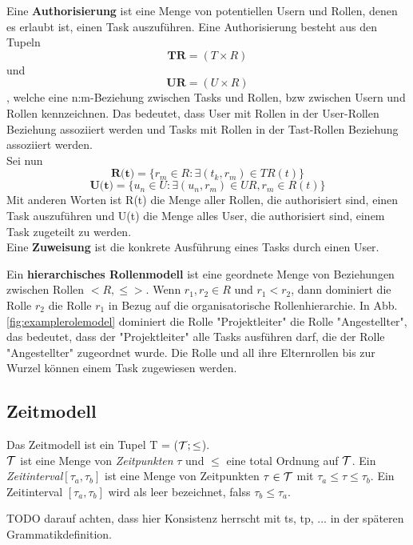 Eine \textbf{Authorisierung} ist eine Menge von potentiellen Usern und Rollen, denen es erlaubt ist, einen Task auszuführen. Eine Authorisierung besteht aus den Tupeln $$\textbf{TR} = (T\times R)$$ und $$\textbf{UR} = (U\times R)$$, welche eine n:m-Beziehung zwischen Tasks und Rollen, bzw zwischen Usern und Rollen kennzeichnen. Das bedeutet, dass User mit Rollen in der User-Rollen Beziehung assoziiert werden und Tasks mit Rollen in der Tast-Rollen Beziehung assoziiert werden.\\
Sei nun $$\textbf{R(t)} = \{r_m \in R: \exists(t_k, r_m) \in TR(t)\}$$
$$\textbf{U(t)} = \{u_n \in U: \exists(u_n, r_m) \in UR, r_m \in R(t)\}$$
Mit anderen Worten ist R(t) die Menge aller Rollen, die authorisiert sind, einen Task auszuführen und U(t) die Menge alles User, die authorisiert sind, einem Task zugeteilt zu werden.\\
Eine \textbf{Zuweisung} ist die konkrete Ausführung eines Tasks durch einen User.

Ein \textbf{hierarchisches Rollenmodell} ist eine geordnete Menge von Beziehungen zwischen Rollen $<R, \leq>$. Wenn $r_1, r_2 \in R$ und $r_1 < r_2$, dann dominiert die Rolle $r_2$ die Rolle $r_1$ in Bezug auf die organisatorische Rollenhierarchie. In Abb. \ref{fig:examplerolemodel} dominiert die Rolle "Projektleiter" die Rolle "Angestellter", das bedeutet, dass der "Projektleiter" alle Tasks ausführen darf, die der Rolle "Angestellter" zugeordnet wurde.
Die Rolle und all ihre Elternrollen bis zur Wurzel können einem Task zugewiesen werden.

\cite{wolter_modeling_of_TBAC_in_BPMN}

\subsection{Zeitmodell}
Das Zeitmodell ist ein Tupel T = ($\mathcal{T};\leq$).\\
$\mathcal{T}$ ist eine Menge von \textit{Zeitpunkten} $\tau$ und $\leq$ eine total Ordnung auf $\mathcal{T}$.
Ein \textit{Zeitinterval}$[\tau_a, \tau_b]$ ist eine Menge von Zeitpunkten $\tau \in \mathcal{T}$ mit $\tau_a \leq \tau \leq \tau_b$.
Ein Zeitinterval $[\tau_a, \tau_b]$ wird als leer bezeichnet, falss $\tau_b \leq \tau_a$.


TODO darauf achten, dass hier Konsistenz herrscht mit ts, tp, ... in der späteren Grammatikdefinition.
\cite{warner_inter_instance}

